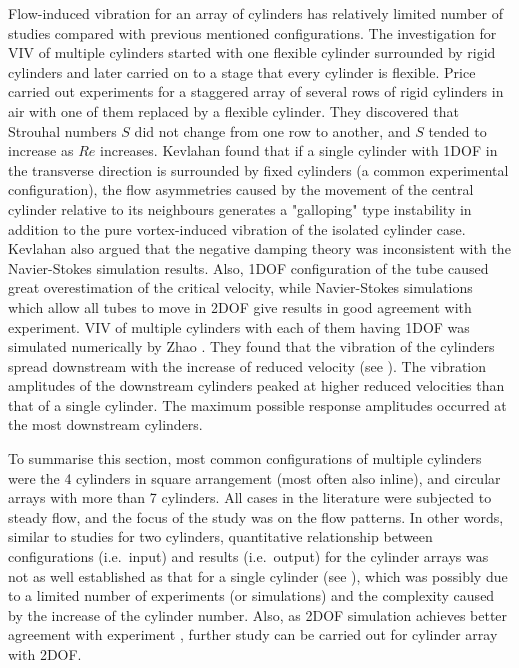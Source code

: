 Flow-induced vibration for an array of cylinders has relatively limited number of studies compared with previous mentioned configurations. The investigation for VIV of multiple cylinders started with one flexible cylinder surrounded by rigid cylinders and later carried on to a stage that every cylinder is flexible. Price \etal{} \cite{Price1995} carried out experiments for a staggered array of several rows of rigid cylinders in air with one of them replaced by a flexible cylinder. They discovered that Strouhal numbers $ S $ did not change from one row to another, and $ S $ tended to increase as $ Re $ increases. Kevlahan \cite{Kevlahan2011} found that if a single cylinder with 1DOF in the transverse direction is surrounded by fixed cylinders (a common experimental configuration), the flow asymmetries caused by the movement of the central cylinder relative to its neighbours generates a "galloping" type instability in addition to the pure vortex-induced vibration of the isolated cylinder case. Kevlahan \cite{Kevlahan2011} also argued that the negative damping theory \cite{paiudoussis1988mechanisms} was inconsistent with the Navier-Stokes simulation results. Also, 1DOF configuration of the tube caused great overestimation of the critical velocity, while Navier-Stokes simulations which allow all tubes to move in 2DOF give results in good agreement with experiment. VIV of multiple cylinders with each of them having 1DOF was simulated numerically by Zhao \etal{} \cite{Zhao2015b}. They found that the vibration of the cylinders spread downstream with the increase of reduced velocity (see ). The vibration amplitudes of the downstream cylinders peaked at higher reduced velocities than that of a single cylinder. The maximum possible response amplitudes occurred at the most downstream cylinders.

To summarise this section, most common configurations of multiple cylinders were the 4 cylinders in square arrangement (most often also inline), and circular arrays with more than 7 cylinders. All cases in the literature were subjected to steady flow, and the focus of the study was on the flow patterns. In other words, similar to studies for two cylinders, quantitative relationship between configurations (i.e.\ input) and results (i.e.\ output) for the cylinder arrays was not as well established as that for a single cylinder (see ), which was possibly due to a limited number of experiments (or simulations) and the complexity caused by the increase of the cylinder number. Also, as 2DOF simulation achieves better agreement with experiment \cite{Kevlahan2011}, further study can be carried out for cylinder array with 2DOF.


